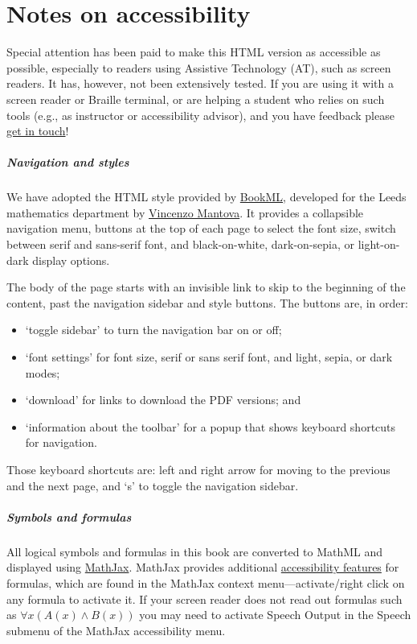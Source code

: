 
\chapter{Notes on accessibility}

Special attention has been paid to make this HTML version as
accessible as possible, especially to readers using Assistive
Technology (AT), such as screen readers. It has, however, not
been extensively tested. If you are using it with a screen reader or
Braille terminal, or are helping a student who relies on such tools
(e.g., as instructor or accessibility advisor), and you have feedback
please \href{mailto:rzach@ucalgary.ca}{get in touch}!

\paragraph{Navigation and styles} We have adopted the HTML style
provided by \href{https://vlmantova.github.io/bookml/}{BookML},
developed for the Leeds mathematics department by
\href{https://eps.leeds.ac.uk/maths/staff/4058/dr-vincenzo-l-mantova}{Vincenzo
Mantova}. It provides a collapsible navigation menu, buttons at the
top of each page to select the font size, switch between serif and
sans-serif font, and black-on-white, dark-on-sepia, or light-on-dark
display options.

The body of the page starts with an invisible link to skip to the
beginning of the content, past the navigation sidebar and style
buttons. The buttons are, in order: 
\begin{itemize}
  \item `toggle sidebar' to turn the navigation bar on or off;
  \item `font settings' for font size, serif or sans serif font, and
    light, sepia, or dark modes; 
  \item `download' for links to download the PDF versions; and 
  \item `information about the toolbar' for a popup that shows
    keyboard shortcuts for navigation.
\end{itemize}
Those keyboard shortcuts are: left and right arrow for moving to the
previous and the next page, and `s' to toggle the navigation sidebar.

\paragraph{Symbols and formulas} All logical symbols and formulas in
this book are converted to MathML and displayed using
\href{https://www.mathjax.org/}{MathJax}. MathJax provides additional
\href{https://docs.mathjax.org/en/latest/basic/accessibility.html}{accessibility
features} for formulas, which are found in the MathJax context
menu---activate/right click on any formula to activate it. If your
screen reader does not read out formulas such as $\forall x(A(x) \land
B(x))$ you may need to activate Speech Output in the Speech submenu of
the MathJax accessibility menu.

